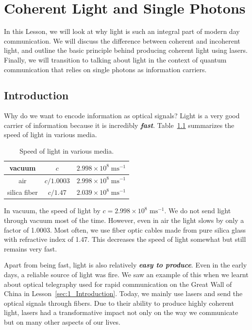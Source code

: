 \chapter{Coherent Light and Single Photons}
\label{sec:5_coherent_light_single_photons}

In this Lesson, we will look at why light is such an integral part of modern day communication.
We will discuss the difference between coherent and incoherent light, and outline the basic principle behind producing coherent light using lasers.
Finally, we will transition to talking about light in the context of quantum communication that relies on single photons as information carriers.

\section{Introduction}
\label{sec:5-1_intoduction}

Why do we want to encode information as optical signals?
Light is a very good carrier of information because it is incredibly \textit{\textbf{fast}}.
Table~\ref{tab:5-1_speed_light} summarizes the speed of light in various media.
\begin{table}[b!]
    \centering
    \begin{tabular}{c|c|c}
        vacuum & $c$ & $2.998\times10^{8} \; \text{ms}^{-1}$  \\
        \hline
        air & $c/1.0003$ & $2.998\times10^{8} \; \text{ms}^{-1}$  \\
        \hline
        silica fiber & $c/1.47$ & $2.039\times10^{8} \; \text{ms}^{-1}$
    \end{tabular}
    \caption[Speed of light]{Speed of light in various media.}
    \label{tab:5-1_speed_light}
\end{table}
In vacuum, the speed of light by $c=2.998\times 10^8$ $\text{ms}^{-1}$.
We do not send light through vacuum most of the time.
However, even in air the light slows by only a factor of 1.0003.
Most often, we use fiber optic cables made from pure silica glass with refractive index of 1.47.
This decreases the speed of light somewhat but still remains very fast.

Apart from being fast, light is also relatively \textit{\textbf{easy to produce}}.
Even in the early days, a reliable source of light was fire.
We saw an example of this when we learnt about optical telegraphy used for rapid communication on the Great Wall of China in Lesson~\ref{sec:1_Introduction}.
Today, we mainly use lasers and send the optical signals through fibers.
Due to their ability to produce highly coherent light, lasers had a transformative impact not only on the way we communicate but on many other aspects of our lives. 

